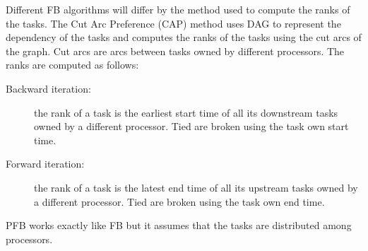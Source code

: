 \documentclass[letterpaper]{article}
\renewcommand{\(}{\left(}
\renewcommand{\)}{\right)}
\renewcommand{\[}{\left[}
\renewcommand{\]}{\right]}
\begin{document}
Different FB algorithms will differ by the method used to compute the ranks of the tasks. The
Cut Arc Preference (CAP) method uses DAG to represent the dependency of the
tasks and computes the ranks of the tasks using the cut arcs of the graph. Cut arcs are arcs between tasks 
owned by different processors. The ranks are computed as follows:
\begin{description}
  \item[Backward iteration:] the rank of a task is the earliest start time of all its downstream tasks
    owned by a different processor. Tied are broken using the task own start time.
  \item[Forward iteration:] the rank of a task is the latest end time of all its upstream tasks owned
    by a different processor. Tied are broken using the task own end time.
\end{description}
PFB works exactly like FB but it assumes that the tasks are distributed among processors.
\end{document}
